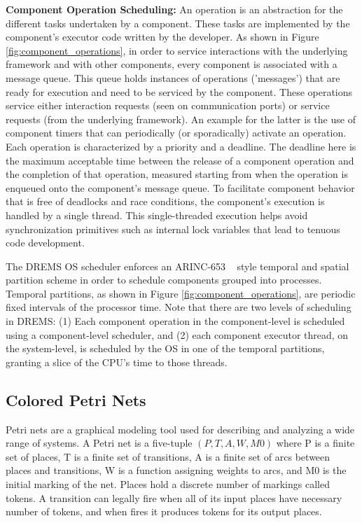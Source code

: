 \noindent
\textbf{Component Operation Scheduling:}
 An operation is an abstraction for the different tasks undertaken by a component. These tasks are implemented by the component's executor code written by the developer. As shown in Figure \ref{fig:component_operations}, in order to service interactions with the underlying framework and with other components, every component is associated with a message queue. This queue holds instances of operations ('messages') that are ready for execution and need to be serviced by the component. These operations service either interaction requests (seen on communication ports) or service requests (from the underlying framework). An example for the latter is the use of component timers that can periodically (or sporadically) activate an operation. Each operation is characterized by a priority and a deadline. The deadline here is the maximum acceptable time between the release of a component operation and the completion of that operation, measured starting from when the operation is enqueued onto the component's message queue.
To facilitate component behavior that is free of deadlocks and race conditions, the component's execution is handled by a single thread. This single-threaded execution helps avoid synchronization primitives such as internal lock variables that lead to tenuous code development.

The DREMS OS scheduler enforces an ARINC-653 ~\cite{ARINC-653} style temporal and spatial partition scheme in order to schedule components grouped into processes. Temporal partitions, as shown in Figure \ref{fig:component_operations}, are periodic fixed intervals of the processor time. Note that there are two levels of scheduling in DREMS: (1) Each component operation in the component-level is scheduled using a component-level scheduler, and (2) each component executor thread, on the system-level, is scheduled by the OS in one of the temporal partitions, granting a slice of the CPU's time to those threads.

\vspace{-0.2in}

\subsection{Colored Petri Nets}

\vspace{-0.1in}

Petri nets \cite{Murata1989} are a graphical modeling tool used for describing and analyzing a wide range of systems. A Petri net is a five-tuple $(P, T, A, W, M0)$ where P is a finite set of places, T is a finite set of transitions, A is a finite set of arcs between places and transitions, W is a function assigning weights to arcs, and M0 is the initial marking of the net. Places hold a discrete number of markings called tokens.  
A transition can legally fire when all of its input places have necessary number of tokens, and when fires it produces tokens for its output places. 

